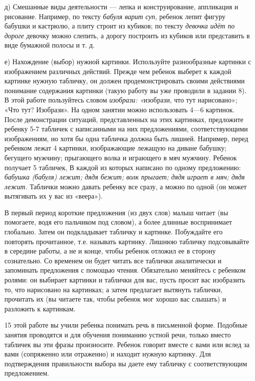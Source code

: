 \documentclass[a5paper]{book}
\renewcommand{\emph}[1]{\textit{#1}}
\begin{document}
д) Смешанные виды деятельности --- лепка и конструирование, аппликация и
рисование. Например, по тексту \emph{бабуля варит суп,} ребенок лепит
фигуру бабушки и кастрюлю, а плиту строит из кубиков; по тексту
\emph{девочка идёт по дороге} девочку можно слепить, а дорогу построить
из кубиков или представить в виде бумажной полосы и т. д.

е) Нахождение (выбор) нужной картинки. Используйте разнообразные
картинки с изображением различных действий. Прежде чем ребенок выберет к
каждой картинке нужную табличку, он должен продемонстрировать своими
действиями понимание содержания картинки (такую работу вы уже проводили
в задании 8). В этой работе пользуйтесь словом \emph{изобрази:
«}изобрази, что тут нарисовано»; «Что тут? Изобрази». На одном занятии
можно использовать 4---6 картинок. После демонстрации ситуаций,
представленных на этих картинках, предложите ребенку 5-7 табличек с
написанными на них предложениями, соответствующими изображениям, но хотя
бы одна табличка должна быть лишней. Например, перед ребенком лежат 4
картинки, изображающие лежащую на диване бабушку; бегущего мужчину;
прыгающего волка и играющего в мяч мужчину. Ребенок получает 5 табличек,
В каждой из которых написано по одному предложению: \emph{бабушка
(бабуля) лежит; дядя бежит; волк прыгает; дядя играет в мяч; дядя
лежит.} Таблички можно давать ребенку все сразу, а можно по одной (он
может вытягивать их у вас из «веера»).

В первый период короткие предложения (из двух слов) малыш читает (вы
помогаете, водя его пальчиком под словом), а более длинные воспринимает
глобально. Затем он подкладывает табличку и картинке. Побуждайте его
повторять прочитанное, т.е. называть картинку. Лишнюю табличку
подсовывайте в середине работы, а не и конце, чтобы ребенок отложил ее в
сторону сознательно. Со временем он будет читать все таблички
аналитически и запоминать предложения с помощью чтения. Обязательно
меняйтесь с ребенком ролями: он выбирает картинки и таблички для вас,
пусть просит вас изобразить то, что нарисовано на картинках; а затем
предлагает вытянуть таблички, прочитать их (вы читаете так, чтобы
ребенок мог хорошо вас слышать) и разложить к картинкам.

15 этой работе вы учили ребенка понимать речь в письменной форме.
Подобные занятия проводятся и для обучения пониманию устной речи, только
вместо табличек вы эти фразы произносите. Ребенок говорит вместе с вами
или вслед за вами (сопряженно или отраженно) и находит нужную картинку.
Для подтверждения правильности выбора вы даете ему табличку с
соответствующим предложением.
\end{document}

